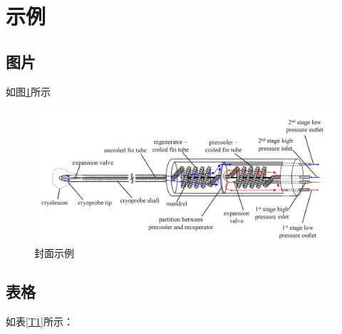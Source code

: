 \section{示例}

\subsection{图片}

如图\ref{F1}所示

\begin{figure}[H]
	\centering
	\includegraphics[width=\linewidth]{pics/1}
	\caption{封面示例}\label{F1}
\end{figure}

\subsection{表格}

如表\ref{T1}所示：

